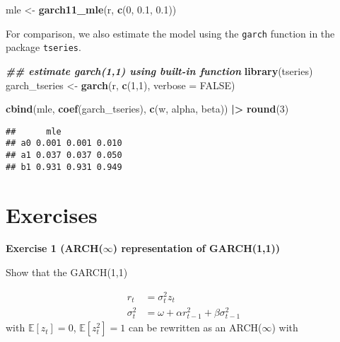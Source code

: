 \documentclass[
]{book}
\newenvironment{Shaded}{\begin{snugshade}}{\end{snugshade}}
\newcommand{\AttributeTok}[1]{\textcolor[rgb]{0.13,0.29,0.53}{#1}}
\newcommand{\ConstantTok}[1]{\textcolor[rgb]{0.56,0.35,0.01}{#1}}
\newcommand{\DecValTok}[1]{\textcolor[rgb]{0.00,0.00,0.81}{#1}}
\newcommand{\DocumentationTok}[1]{\textcolor[rgb]{0.56,0.35,0.01}{\textbf{\textit{#1}}}}
\newcommand{\FloatTok}[1]{\textcolor[rgb]{0.00,0.00,0.81}{#1}}
\newcommand{\FunctionTok}[1]{\textcolor[rgb]{0.13,0.29,0.53}{\textbf{#1}}}
\newcommand{\NormalTok}[1]{#1}
\newcommand{\OtherTok}[1]{\textcolor[rgb]{0.56,0.35,0.01}{#1}}
\newcommand{\SpecialCharTok}[1]{\textcolor[rgb]{0.81,0.36,0.00}{\textbf{#1}}}
\begin{document}
\begin{Shaded}
\begin{Highlighting}[]
\NormalTok{mle }\OtherTok{\textless{}{-}} \FunctionTok{garch11\_mle}\NormalTok{(r, }\FunctionTok{c}\NormalTok{(}\DecValTok{0}\NormalTok{, }\FloatTok{0.1}\NormalTok{, }\FloatTok{0.1}\NormalTok{))}
\end{Highlighting}
\end{Shaded}

For comparison, we also estimate the model using the \texttt{garch} function in the package \texttt{tseries}.

\begin{Shaded}
\begin{Highlighting}[]
\DocumentationTok{\#\# estimate garch(1,1) using built{-}in function}
\FunctionTok{library}\NormalTok{(tseries)}
\NormalTok{garch\_tseries }\OtherTok{\textless{}{-}} \FunctionTok{garch}\NormalTok{(r, }\FunctionTok{c}\NormalTok{(}\DecValTok{1}\NormalTok{,}\DecValTok{1}\NormalTok{), }\AttributeTok{verbose =} \ConstantTok{FALSE}\NormalTok{)}
\end{Highlighting}
\end{Shaded}

\begin{Shaded}
\begin{Highlighting}[]
\FunctionTok{cbind}\NormalTok{(mle, }\FunctionTok{coef}\NormalTok{(garch\_tseries), }\FunctionTok{c}\NormalTok{(w, alpha, beta)) }\SpecialCharTok{|\textgreater{}} \FunctionTok{round}\NormalTok{(}\DecValTok{3}\NormalTok{)}
\end{Highlighting}
\end{Shaded}

\begin{verbatim}
##      mle            
## a0 0.001 0.001 0.010
## a1 0.037 0.037 0.050
## b1 0.931 0.931 0.949
\end{verbatim}

\hypertarget{exercises-2}{%
\section{Exercises}\label{exercises-2}}

\textbf{Exercise 1 (ARCH(\(\infty\)) representation of GARCH(1,1))}

Show that the GARCH(1,1)

\[
\begin{aligned}
r_t &= \sigma^2_t z_t \\[1ex]
\sigma^2_t &= \omega + \alpha r_{t-1}^2 + \beta \sigma^2_{t-1}
\end{aligned}
\]
with \(\mathbb{E}[z_t] = 0\), \(\mathbb{E}[z^2_t] = 1\) can be rewritten as an ARCH(\(\infty\)) with
\end{document}
